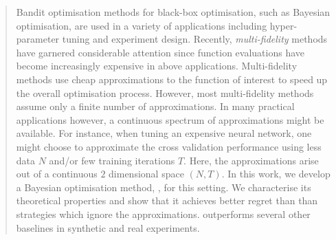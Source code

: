 
\begin{abstract}
Bandit optimisation methods for black-box optimisation, such as Bayesian optimisation, 
are used in a variety of applications including hyper-parameter tuning and
experiment design.
Recently, \emph{multi-fidelity} methods have garnered
considerable attention since function evaluations have become increasingly expensive in
above applications.
Multi-fidelity methods use cheap approximations to the function of
interest to speed up the overall optimisation process.
However, most multi-fidelity methods assume only a finite number of approximations.
In many practical applications however, a continuous spectrum of approximations might be
available.
For instance, when tuning an expensive neural network, one might choose to approximate the
cross validation performance using less data $N$ and/or few training iterations $T$.
Here, the approximations arise out of a continuous $2$ dimensional space $(N,T)$.
In this work, we develop a Bayesian optimisation method, \boca, for this setting.
We characterise its theoretical properties and show that it achieves better regret than
than strategies which ignore the approximations.
\bocas outperforms several other baselines in synthetic and real experiments.
\end{abstract}
